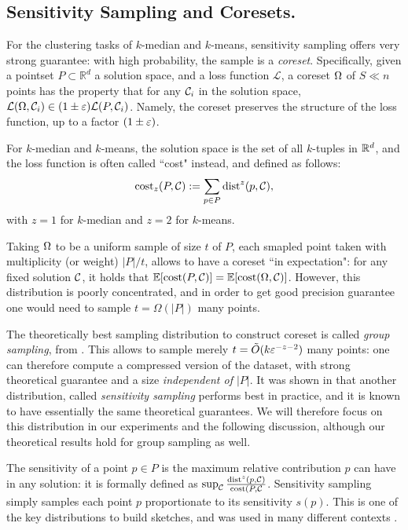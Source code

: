 \subsection{Sensitivity Sampling and Coresets.}
For the clustering tasks of $k$-median and $k$-means, sensitivity sampling offers very strong guarantee: with high probability, the sample is a \textit{coreset}.
Specifically, given a pointset $P \subset \mathbb{R}^{d}$
a solution space, and a loss function $\mathcal{L}$, a coreset $\Omega$ of $S \ll n$ points has the property that for any $\mathcal C_i$ in the solution space, $\mathcal{L}(\Omega,
\mathcal C_i) \in (1 \pm \varepsilon) \mathcal{L}(P, \mathcal C_i)$. Namely, the coreset preserves the structure of the loss function, up to a factor $(1\pm \varepsilon)$.

For $k$-median and $k$-means, the solution space is the set of all $k$-tuples in $\mathbb{R}^d$, and the loss function is often called ``cost" instead, and defined as follows:
\[\operatorname{cost}_z(P, \mathcal C) := \sum_{p \in P} \operatorname{dist}^z(p, \mathcal C),\]
with $z=1$ for $k$-median and $z=2$ for $k$-means.

Taking $\Omega$ to be a uniform sample of size $t$ of $P$, each smapled point taken with multiplicity (or weight) $|P|/t$, allows to have a coreset ``in expectation": for any fixed solution $\mathcal C$, it holds that $\mathbb{E}[\operatorname{cost}(P, \mathcal C)] = \mathbb{E}[\operatorname{cost}(\Omega, \mathcal C)]$. However, this distribution is poorly concentrated, and in order to get good precision guarantee one would need to sample $t = \Omega(|P|)$ many points. 

The theoretically best sampling distribution to construct coreset is called \textit{group sampling}, from \cite{stoc21}. This allows to sample merely $t = \tilde O(k \varepsilon^{-z - 2})$ many points: one can therefore compute a compressed version of the dataset, with strong theoretical guarantee and a size \textit{independent of $|P|$}.
It was shown in \cite{chrisESA} that another distribution, called \textit{sensitivity sampling} performs best in practice, and it is known to have essentially the same theoretical guarantees. We will therefore focus on this distribution in our experiments and the following discussion, although our theoretical results hold for group sampling as well.

The sensitivity of a point $p \in P$ is the maximum relative contribution $p$ can have in any solution: it is formally defined as $\sup_{\mathcal C} \frac{\operatorname{dist}^z(p, \mathcal C)}{\operatorname{cost}(P, \mathcal C}$. 
Sensitivity sampling simply samples each point $p$ proportionate to its sensitivity $s(p)$. This is one of the key distributions to build sketches, and was used in many different contexts \cite{}.

